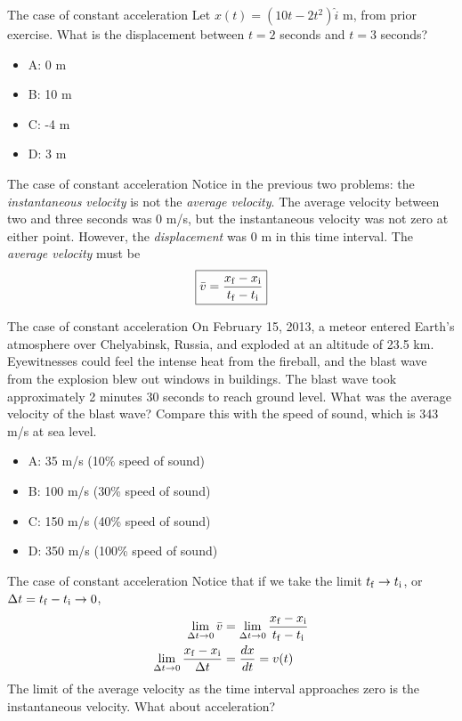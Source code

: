 \documentclass{beamer}
\begin{document}
\begin{frame}{The case of constant acceleration}
Let $x(t) = (10t-2t^2)\hat{i}$ m, from prior exercise.  What is the displacement between $t=2$ seconds and $t=3$ seconds?
\begin{itemize}
\item A: 0 m
\item B: 10 m
\item C: -4 m
\item D: 3 m
\end{itemize}
\end{frame}

\begin{frame}{The case of constant acceleration}
Notice in the previous two problems: the \textit{instantaneous velocity} is not the \textit{average velocity}.  The average velocity between two and three seconds was 0 m/s, but the instantaneous velocity was not zero at either point.  However, the \textit{displacement} was 0 m in this time interval.  The \textit{average velocity} must be \\
\begin{equation}
\boxed{\bar{v} = \frac{x_{\rm f} - x_{\rm i}}{t_{\rm f} - t_{\rm i}}} \label{eq:avevel}
\end{equation}
\end{frame}

\begin{frame}{The case of constant acceleration}
\small
On February 15, 2013, a meteor entered Earth’s atmosphere over Chelyabinsk, Russia, and exploded at an altitude of 23.5 km.  Eyewitnesses could feel the intense heat from the fireball, and the blast wave from the explosion blew out windows in buildings. The blast wave took approximately 2 minutes 30 seconds to reach ground level.  What was the average velocity of the blast wave?  Compare this with the speed of sound, which is 343 m/s at sea level.
\begin{itemize}
\item A: 35 m/s (10\% speed of sound)
\item B: 100 m/s (30\% speed of sound)
\item C: 150 m/s (40\% speed of sound)
\item D: 350 m/s (100\% speed of sound)
\end{itemize}
\end{frame}

\begin{frame}{The case of constant acceleration}
Notice that if we take the limit $t_{\rm f} \to t_{\rm i}$, or $\Delta t = t_{\rm f} - t_{\rm i} \to 0$, \\
\begin{align}
\lim_{\Delta t \to 0} \bar{v} &= \lim_{\Delta t \to 0} \frac{x_{\rm f} - x_{\rm i}}{t_{\rm f} - t_{\rm i}} \\
\lim_{\Delta t \to 0} \frac{x_{\rm f} - x_{\rm i}}{\Delta t} &= \frac{dx}{dt} = v(t)
\end{align}
The limit of the average velocity as the time interval approaches zero is the instantaneous velocity.  What about acceleration?
\end{frame}
\end{document}
